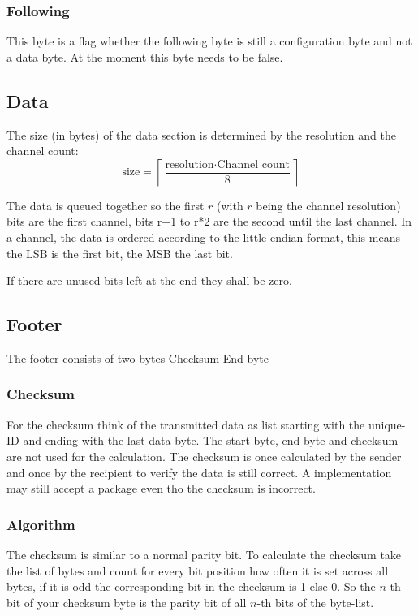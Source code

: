\documentclass{scrreprt}
\begin{document}
\subsubsection{Following}
This byte is a flag whether the following byte is still a configuration
byte and not a data byte. At the moment this byte needs to be false.

\subsection{Data}
The size (in bytes) of the data section is determined by
the resolution and the channel count:
\begin{equation}
  \text{size} = \left\lceil{\frac{\text{resolution} \cdot \text{Channel count}}{8}} \right\rceil
\end{equation}

The data is queued together so the first $r$ (with $r$ being the channel
resolution) bits are the first channel, bits r+1 to r*2 are the second
until the last channel. In a channel, the data is ordered according to the little endian format,
this means the LSB is the first bit, the MSB the last bit.

If there are unused bits left at the end they shall be zero.

\subsection{Footer}
The footer consists of two bytes Checksum End byte

\subsubsection{Checksum}
For the checksum think of the transmitted data as list starting with the
unique-ID and ending with the last data byte. The start-byte, end-byte and checksum are not used for the calculation. 
The checksum is once calculated by the sender and once by the recipient to verify the data is
still correct. A implementation may still accept a package even tho the checksum is incorrect.

\subsubsection{Algorithm}
The checksum is similar to a normal parity bit. To calculate the checksum
take the list of bytes and count for every bit position how often it is set across all bytes,
if it is odd the corresponding bit in the checksum is 1 else 0.
So the $n$-th bit of your checksum byte is the parity bit of all $n$-th
bits of the byte-list.
\end{document}

